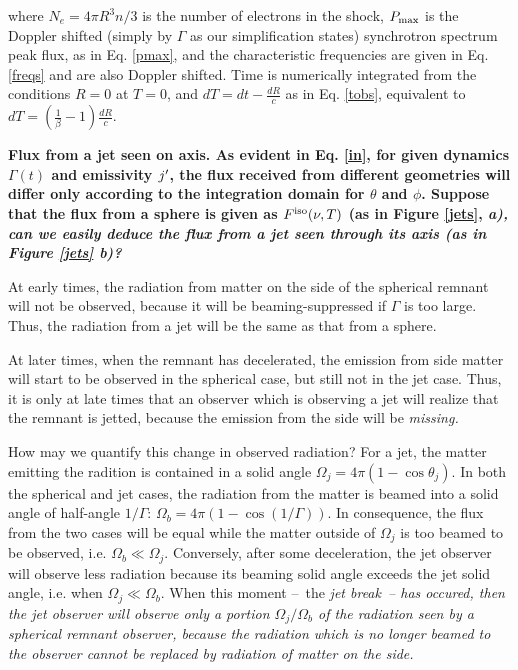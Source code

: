where $N_e = 4 \pi R^3 n / 3$ is the number of electrons in the shock, $P_\rm{max}$ is the Doppler shifted (simply by $\Gamma$ as our simplification states) synchrotron spectrum peak flux, as in Eq. \ref{pmax}, and the characteristic frequencies are given in Eq. \ref{freqs} and are also Doppler shifted. Time is numerically integrated from the conditions $R = 0$ at $T = 0$, and $dT = dt - \frac{dR}{c}$ as in Eq. \ref{tobs}, equivalent to $dT = \left( \frac{1}{\beta} - 1\right)\frac{dR}{c}$.


\bf{Flux from a jet seen on axis.} As evident in Eq. \ref{in}, for given dynamics $\Gamma(t)$ and emissivity $j\p$, the flux received from different geometries will differ only according to the integration domain for $\theta$ and $\phi$. Suppose that the flux from a sphere is given as $F^\rm{iso}(\nu, T)$ (as in Figure \ref{jets}, \it{a}), can we easily deduce the flux from a jet seen through its axis (as in Figure \ref{jets} \it{b})?

At early times, the radiation from matter on the side of the spherical remnant will not be observed, because it will be beaming-suppressed if $\Gamma$ is too large. Thus, the radiation from a jet will be the same as that from a sphere.

At later times, when the remnant has decelerated, the emission from side matter will start to be observed in the spherical case, but still not in the jet case. Thus, it is only at late times that an observer which is observing a jet will realize that the remnant is jetted, because the emission from the side will be \it{missing}.

How may we quantify this change in observed radiation? For a jet, the matter emitting the radition is contained in a solid angle $\Omega_j = 4\pi(1 - \cos \theta_j)$. In both the spherical and jet cases, the radiation from the matter is beamed into a solid angle of half-angle $1/\Gamma$: $\Omega_b = 4\pi(1 - \cos(1/\Gamma))$. In consequence, the flux from the two cases will be equal while the matter outside of $\Omega_j$ is too beamed to be observed, i.e. $\Omega_b \ll \Omega_j$. Conversely, after some deceleration, the jet observer will observe less radiation because its beaming solid angle exceeds the jet solid angle, i.e. when $\Omega_j \ll \Omega_b$. When this moment --~the \it{jet break}~-- has occured, then the jet observer will observe only a portion $\Omega_j/\Omega_b$ of the radiation seen by a spherical remnant observer, because the radiation which is no longer beamed to the observer cannot be replaced by radiation of matter on the side.

